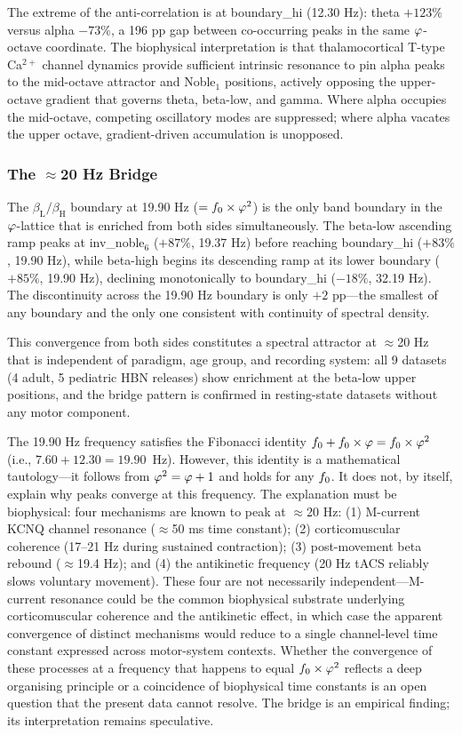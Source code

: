 The extreme of the anti-correlation is at boundary\_hi (12.30 Hz): theta $+123\%$ versus alpha $-73\%$, a 196 pp gap between co-occurring peaks in the same $\varphi$-octave coordinate. The biophysical interpretation is that thalamocortical T-type Ca$^{2+}$ channel dynamics provide sufficient intrinsic resonance to pin alpha peaks to the mid-octave attractor and Noble$_1$ positions, actively opposing the upper-octave gradient that governs theta, beta-low, and gamma. Where alpha occupies the mid-octave, competing oscillatory modes are suppressed; where alpha vacates the upper octave, gradient-driven accumulation is unopposed.

\subsubsection{The $\approx$20 Hz Bridge}
\label{sec:bridge}

The $\beta_{\mathrm{L}}/\beta_{\mathrm{H}}$ boundary at 19.90 Hz ($= f_0 \times \varphi^2$) is the only band boundary in the $\varphi$-lattice that is enriched from both sides simultaneously. The beta-low ascending ramp peaks at inv\_noble$_6$ ($+87\%$, 19.37 Hz) before reaching boundary\_hi ($+83\%$, 19.90 Hz), while beta-high begins its descending ramp at its lower boundary ($+85\%$, 19.90 Hz), declining monotonically to boundary\_hi ($-18\%$, 32.19 Hz). The discontinuity across the 19.90 Hz boundary is only $+2$ pp---the smallest of any boundary and the only one consistent with continuity of spectral density.

This convergence from both sides constitutes a spectral attractor at $\approx$20 Hz that is independent of paradigm, age group, and recording system: all 9 datasets (4 adult, 5 pediatric HBN releases) show enrichment at the beta-low upper positions, and the bridge pattern is confirmed in resting-state datasets without any motor component.

The 19.90 Hz frequency satisfies the Fibonacci identity $f_0 + f_0 \times \varphi = f_0 \times \varphi^2$ (i.e., $7.60 + 12.30 = 19.90$~Hz). However, this identity is a mathematical tautology---it follows from $\varphi^2 = \varphi + 1$ and holds for any $f_0$. It does not, by itself, explain why peaks converge at this frequency. The explanation must be biophysical: four mechanisms are known to peak at $\approx$20 Hz: (1) M-current KCNQ channel resonance ($\approx$50 ms time constant); (2) corticomuscular coherence (17--21 Hz during sustained contraction); (3) post-movement beta rebound ($\approx$19.4 Hz); and (4) the antikinetic frequency (20 Hz tACS reliably slows voluntary movement). These four are not necessarily independent---M-current resonance could be the common biophysical substrate underlying corticomuscular coherence and the antikinetic effect, in which case the apparent convergence of distinct mechanisms would reduce to a single channel-level time constant expressed across motor-system contexts. Whether the convergence of these processes at a frequency that happens to equal $f_0 \times \varphi^2$ reflects a deep organising principle or a coincidence of biophysical time constants is an open question that the present data cannot resolve. The bridge is an empirical finding; its interpretation remains speculative.
